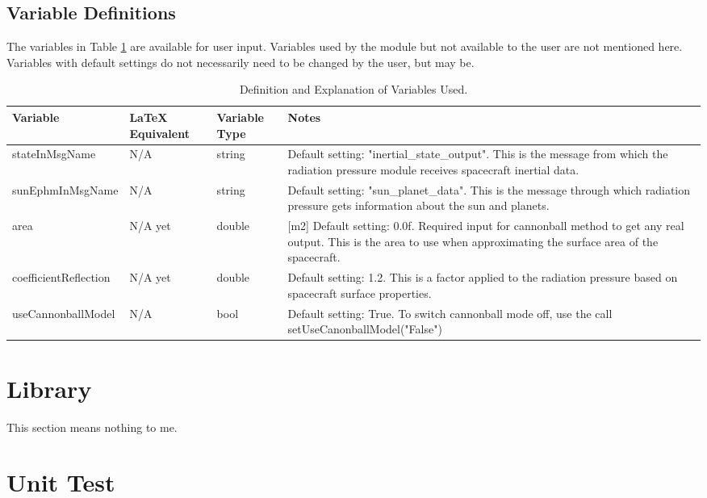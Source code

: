 \documentclass[]{BasiliskReportMemo}
\begin{document}
\subsection{Variable Definitions}
The variables in Table \ref{tabular:vars} are available for user input. Variables used by the module but not available to the user are not mentioned here. Variables with default settings do not necessarily need to be changed by the user, but may be.
	\begin{table}[H]
		\caption{Definition and Explanation of Variables Used.}
		\label{tab:errortol}
		\centering \fontsize{10}{10}\selectfont
		\begin{tabular}{ | m{3cm}| m{3cm} | m{3cm} | m{6cm} |} %
			\hline
			\textbf{Variable}   		& \textbf{LaTeX Equivalent} 	&		\textbf{Variable Type} & \textbf{Notes} \\ \hline
			stateInMsgName			&N/A		   							    & string 								& Default setting: "inertial\_state\_output". This is the message from which the radiation pressure module receives spacecraft inertial data.\\ \hline
			sunEphmInMsgName	& N/A 										& string 								& Default setting: "sun\_planet\_data". This is the message through which radiation pressure gets information about the sun and planets.\\ \hline
			area 						  	  & N/A yet 							    & double 								& [m2] Default setting: 0.0f. Required input for cannonball method to get any real output. This is the area to use when approximating the surface area of the spacecraft.\\ \hline
			coefficientReflection 	  & N/A yet 								& double 								& Default setting: 1.2. This is a factor applied to the radiation pressure based on spacecraft surface properties.\\ \hline
			useCannonballModel	   & N/A 									   & bool 									& Default setting: True. To switch cannonball mode off, use the call setUseCanonballModel("False")\\ \hline
		\end{tabular}
	\label{tabular:vars}
	\end{table}
\section{Library}
This section means nothing to me.

\section{Unit Test}
\end{document}

